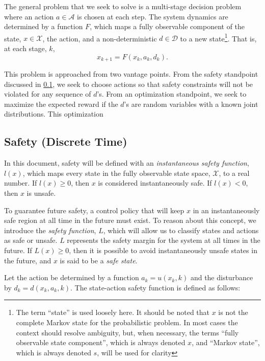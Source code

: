 \documentclass{article}
\newcommand{\aspace}{\ensuremath{\mathcal{A}} }
\begin{document}
The general problem that we seek to solve is a multi-stage decision problem where an action $a \in \aspace$ is chosen at each step.
The system dynamics are determined by a function $F$, which maps a fully observable component of the state, $x \in \mathcal{X}$, the action, and a non-deterministic $d \in \mathcal{D}$ to a new state\footnote{The term ``state'' is used loosely here. It should be noted that $x$ is not the complete Markov state for the probabilistic problem. In most cases the context should resolve ambiguity, but, when necessary, the terms ``fully observable state component'', which is always denoted $x$, and ``Markov state'', which is always denoted $s$, will be used for clarity}.
That is, at each stage, $k$,
\begin{equation}
    x_{k+1} = F(x_k, a_k, d_k) \text{.}
\end{equation}

This problem is approached from two vantage points.
From the safety standpoint discussed in \cref{sec:safety}, we seek to choose actions so that safety constraints will not be violated for any sequence of $d$'s.
From an optimization standpoint, we seek to maximize the expected reward if the $d$'s are random variables with a known joint distributions.
This optimization 

\subsection{Safety (Discrete Time)} \label{sec:safety}

In this document, safety will be defined with an \emph{instantaneous safety function}, $l(x)$, which maps every state in the fully observable state space, $\mathcal{X}$, to a real number.
If $l(x) \geq 0$, then $x$ is considered instantaneously safe. If $l(x) < 0$, then $x$ is unsafe.

To guarantee future safety, a control policy that will keep $x$ in an instantaneously safe region at all time in the future must exist.
To reason about this concept, we introduce the \emph{safety function}, $L$, which will allow us to classify states and actions as safe or unsafe.
$L$ represents the safety margin for the system at all times in the future.
If $L(x) \geq 0$, then it is possible to avoid instantaneously unsafe states in the future, and $x$ is said to be a \emph{safe state}.  

Let the action be determined by a function $a_k = u(x_k, k)$ and the disturbance by $d_k = d(x_k, a_k, k)$.
The state-action safety function is defined as follows:
\end{document}
